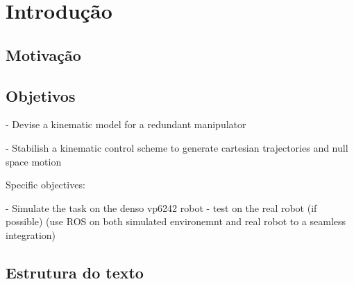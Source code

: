 \chapter{Introdução}\label{cap:introduction}

\section{Motivação}\label{sec:motivation}


\section{Objetivos}\label{sec:objectives}


- Devise a kinematic model for a redundant manipulator

- Stabilish a kinematic control scheme to generate cartesian trajectories and null space motion

Specific objectives:

- Simulate the task on the denso vp6242 robot
- test on the real robot (if possible) (use ROS on both simulated environemnt and real robot to a seamless integration)

\section{Estrutura do texto}\label{sec:structure}
